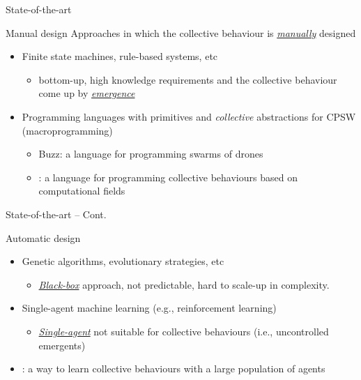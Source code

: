 \documentclass[presentation, 9pt]{beamer}\mode<presentation>{\usetheme{AMSBolognaFC}}
\begin{document}
\begin{frame}{State-of-the-art}
  \begin{exampleblock}{Manual design}
  Approaches in which the collective behaviour is \emph{\underline{manually}} designed
  \begin{itemize}
    \item Finite state machines, rule-based systems, etc
    \begin{itemize}
      \item bottom-up, high knowledge requirements and the collective behaviour come up by \emph{\underline{emergence}}
    \end{itemize}
    \item Programming languages with primitives and \emph{collective} abstractions for CPSW (macroprogramming)
    \begin{itemize}
      \item Buzz: a language for programming swarms of drones
      \item {}: a language for programming collective behaviours based on computational fields
    \end{itemize}
  \end{itemize}  
  \end{exampleblock}
\end{frame}
\begin{frame}{State-of-the-art -- Cont.}
  \begin{exampleblock}{Automatic design}
    \begin{itemize}
      \item Genetic algorithms, evolutionary strategies, etc
      \begin{itemize}
        \item \emph{\underline{Black-box}} approach, not predictable, hard to scale-up in complexity.
      \end{itemize}
      \item Single-agent machine learning (e.g., reinforcement learning)
      \begin{itemize}
        \item \emph{\underline{Single-agent}} not suitable for collective behaviours (i.e., uncontrolled emergents)
      \end{itemize}
      \item {}: a way to learn collective behaviours with a large population of agents
    \end{itemize}
  \end{exampleblock}
  
\end{frame}
\end{document}
